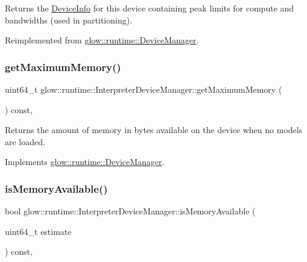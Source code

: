 Returns the \hyperlink{structglow_1_1runtime_1_1_device_info}{Device\+Info} for this device containing peak limits for compute and bandwidths (used in partitioning). 

Reimplemented from \hyperlink{classglow_1_1runtime_1_1_device_manager_aaf319fc3b9aa67c5e053bdf690e89d34}{glow\+::runtime\+::\+Device\+Manager}.

\mbox{\label{classglow_1_1runtime_1_1_interpreter_device_manager_a6b7d0747cee65050a106437a55997036}} 
\subsubsection{\texorpdfstring{get\+Maximum\+Memory()}{getMaximumMemory()}}
{\footnotesize\ttfamily uint64\+\_\+t glow\+::runtime\+::\+Interpreter\+Device\+Manager\+::get\+Maximum\+Memory (\begin{DoxyParamCaption}{ }\end{DoxyParamCaption}) const\hspace{0.3cm}{\ttfamily [override]}, {\ttfamily [virtual]}}

Returns the amount of memory in bytes available on the device when no models are loaded. 

Implements \hyperlink{classglow_1_1runtime_1_1_device_manager_ad158f1c1f9f32b48927f50d48f80decb}{glow\+::runtime\+::\+Device\+Manager}.

\mbox{\label{classglow_1_1runtime_1_1_interpreter_device_manager_a04615e8203b6f581e8646f631346418a}} 
\subsubsection{\texorpdfstring{is\+Memory\+Available()}{isMemoryAvailable()}}
{\footnotesize\ttfamily bool glow\+::runtime\+::\+Interpreter\+Device\+Manager\+::is\+Memory\+Available (\begin{DoxyParamCaption}\item[{uint64\+\_\+t}]{estimate }\end{DoxyParamCaption}) const\hspace{0.3cm}{\ttfamily [override]}, {\ttfamily [virtual]}}

